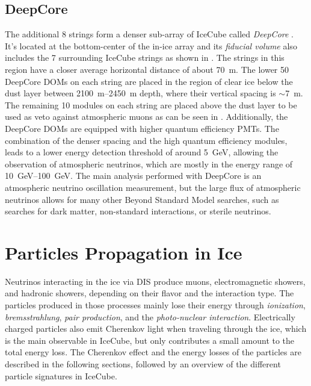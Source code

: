 \subsection{DeepCore}

The additional 8 strings form a denser sub-array of IceCube called \textit{DeepCore} . It's located at the bottom-center of the in-ice array and its \textit{fiducial volume} also includes the 7 surrounding IceCube strings as shown in . The strings in this region have a closer average horizontal distance of about \SI{70}{\metre}. The lower 50 DeepCore DOMs on each string are placed in the region of clear ice below the dust layer between \SIrange{2100}{2450}{\metre} depth, where their vertical spacing is $\sim$\SI{7}{\metre}. The remaining 10 modules on each string are placed above the dust layer to be used as veto against atmospheric muons as can be seen in . Additionally, the DeepCore DOMs are equipped with higher quantum efficiency PMTs. The combination of the denser spacing and the high quantum efficiency modules, leads to a lower energy detection threshold of around \SI{5}{GeV}, allowing the observation of atmospheric neutrinos, which are mostly in the energy range of \SIrange{10}{100}{\giga\electronvolt}. The main analysis performed with DeepCore is an atmospheric neutrino oscillation measurement, but the large flux of atmospheric neutrinos allows for many other Beyond Standard Model searches, such as searches for dark matter, non-standard interactions, or sterile neutrinos. 


\section{Particles Propagation in Ice} 

Neutrinos interacting in the ice via DIS produce muons, electromagnetic showers, and hadronic showers, depending on their flavor and the interaction type. The particles produced in those processes mainly lose their energy through \textit{ionization}, \textit{bremsstrahlung}, \textit{pair production}, and the \textit{photo-nuclear interaction}. Electrically charged particles also emit Cherenkov light when traveling through the ice, which is the main observable in IceCube, but only contributes a small amount to the total energy loss. The Cherenkov effect and the energy losses of the particles are described in the following sections, followed by an overview of the different particle signatures in IceCube.



